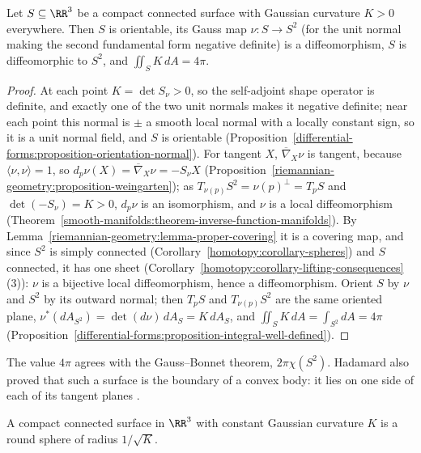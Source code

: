 \begin{theorem}[Hadamard]\label{riemannian-geometry:theorem-hadamard}
Let $S \subseteq \RR^3$ be a compact connected surface with Gaussian curvature $K > 0$ everywhere. Then $S$ is orientable, its Gauss map $\nu \colon S \to S^2$ (for the unit normal
making the second fundamental form negative definite) is a diffeomorphism, $S$ is diffeomorphic to $S^2$, and $\iint_SK\,dA = 4\pi$.
\end{theorem}

\begin{proof}
At each point $K = \det S_\nu > 0$, so the self-adjoint shape operator is definite, and exactly one of the two unit normals makes it negative definite; near each point this normal is
$\pm$ a smooth local normal with a locally constant sign, so it is a unit normal field, and $S$ is orientable (Proposition~\ref{differential-forms:proposition-orientation-normal}). For
tangent $X$, $\overline{\nabla}_X\nu$ is tangent, because $\langle\nu, \nu\rangle = 1$, so $d_p\nu(X) = \overline{\nabla}_X\nu = -S_\nu X$
(Proposition~\ref{riemannian-geometry:proposition-weingarten}); as $T_{\nu(p)}S^2 = \nu(p)^\perp = T_pS$ and $\det(-S_\nu) = K > 0$, $d_p\nu$ is an isomorphism, and $\nu$ is a local
diffeomorphism (Theorem~\ref{smooth-manifolds:theorem-inverse-function-manifolds}). By Lemma~\ref{riemannian-geometry:lemma-proper-covering} it is a covering map, and since $S^2$ is simply
connected (Corollary~\ref{homotopy:corollary-spheres}) and $S$ connected, it has one sheet (Corollary~\ref{homotopy:corollary-lifting-consequences}(3)): $\nu$ is a bijective local
diffeomorphism, hence a diffeomorphism. Orient $S$ by $\nu$ and $S^2$ by its outward normal; then $T_pS$ and $T_{\nu(p)}S^2$ are the same oriented plane, $\nu^*(dA_{S^2}) = \det(d\nu)\,dA_S = K\,dA_S$,
and $\iint_SK\,dA = \int_{S^2}dA = 4\pi$ (Proposition~\ref{differential-forms:proposition-integral-well-defined}).
\end{proof}

The value $4\pi$ agrees with the Gauss--Bonnet theorem, $2\pi\chi(S^2)$. Hadamard also proved that such a surface is the boundary of a convex body: it lies on one side of each
of its tangent planes \cite[Chapter 5]{do-carmo-curves-surfaces}.

\begin{theorem}[Liebmann]\label{riemannian-geometry:theorem-liebmann}
A compact connected surface in $\RR^3$ with constant Gaussian curvature $K$ is a round sphere of radius $1/\sqrt{K}$.
\end{theorem}

